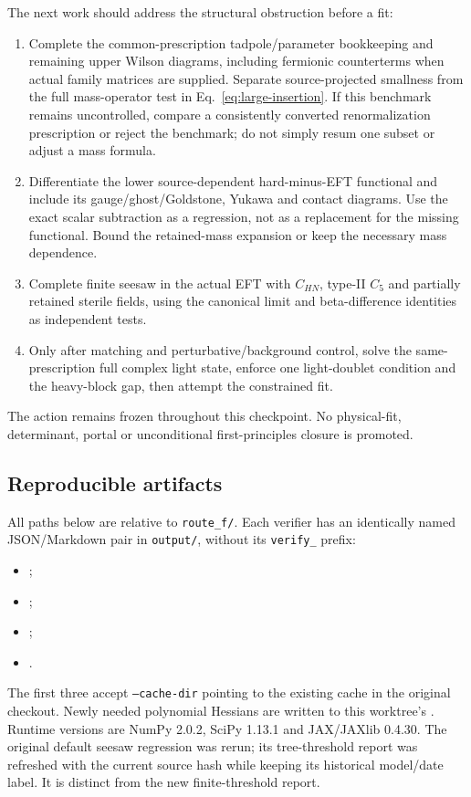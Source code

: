 \documentclass[11pt]{article}
\begin{document}
The next work should address the structural obstruction before a fit:
\begin{enumerate}
\item Complete the common-prescription tadpole/parameter bookkeeping and
remaining upper Wilson diagrams, including fermionic counterterms when
actual family matrices are supplied. Separate source-projected smallness
from the full mass-operator test in Eq.~\eqref{eq:large-insertion}.
If this benchmark remains uncontrolled, compare a consistently converted
renormalization prescription or reject the benchmark; do not simply
resum one subset or adjust a mass formula.
\item Differentiate the lower source-dependent hard-minus-EFT functional
and include its gauge/ghost/Goldstone, Yukawa and contact diagrams. Use
the exact scalar subtraction as a regression, not as a replacement for
the missing functional. Bound the retained-mass expansion or keep the
necessary mass dependence.
\item Complete finite seesaw in the actual EFT with $C_{HN}$, type-II
$C_5$ and partially retained sterile fields, using the canonical limit
and beta-difference identities as independent tests.
\item Only after matching and perturbative/background control, solve the
same-prescription full complex light state, enforce one light-doublet
condition and the heavy-block gap, then attempt the constrained fit.
\end{enumerate}
The action remains frozen throughout this checkpoint. No physical-fit,
determinant, portal or unconditional first-principles closure is promoted.

\subsection*{Reproducible artifacts}
All paths below are relative to \texttt{route\_f/}. Each verifier has an
identically named JSON/Markdown pair in \texttt{output/}, without its
\texttt{verify\_} prefix:
\begin{itemize}
\item {};
\item {};
\item {};
\item {}.
\end{itemize}
The first three accept \texttt{--cache-dir} pointing to the existing
 cache in the original checkout. Newly
needed polynomial Hessians are written to this worktree's
. Runtime versions are NumPy 2.0.2,
SciPy 1.13.1 and JAX/JAXlib 0.4.30. The original default seesaw regression
was rerun; its tree-threshold report was refreshed with the current source
hash while keeping its historical model/date label. It is distinct from
the new finite-threshold report.
\end{document}
